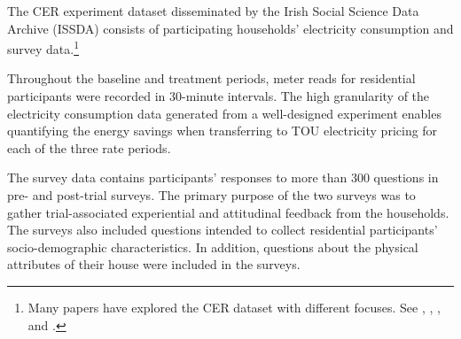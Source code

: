 
The CER experiment dataset disseminated by the Irish Social Science Data Archive (ISSDA) consists of participating households' electricity consumption and survey data.\footnote{Many papers have explored the CER dataset with different focuses. See \cite{Reducing-Household-Electricity-Demand-through-Smart-Metering_Carroll-et-al_2014}, \cite{Unintended-Outcomes-of-Electricity-Smart-Metering_McCoy-and-Lyons_2016}, \cite{Nudging-Electricity-Consumption-using-TOU-Pricing-and-Feedback_Cosmo-and-OHora_2017}, and \cite{Estimating-the-Impact-of-Time-Of-Use-Pricing-on-Irish-Electricity-Demand_Di-Cosmo-et-al_2014}.}  

Throughout the baseline and treatment periods, meter reads for residential participants were recorded in 30-minute intervals. The high granularity of the electricity consumption data generated from a well-designed experiment enables quantifying the energy savings when transferring to TOU electricity pricing for each of the three rate periods. 

The survey data contains participants' responses to more than 300 questions in pre- and post-trial surveys. The primary purpose of the two surveys was to gather trial-associated experiential and attitudinal feedback from the households. The surveys also included questions intended to collect residential participants' socio-demographic characteristics. In addition, questions about the physical attributes of their house were included in the surveys. 


